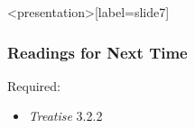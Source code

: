 % 

\begin{frame}<presentation>[label=slide7]
    \frametitle{Readings for Next Time}
        Required:
            \begin{itemize}
                \item \emph{Treatise} 3.2.2
            \end{itemize}
\end{frame}



